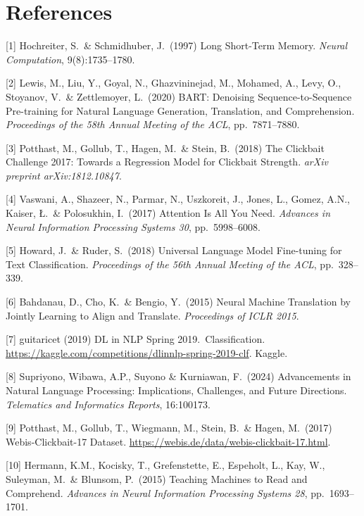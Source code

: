 \documentclass{article}
\begin{document}
\section*{References}
\medskip
{
\small

[1] Hochreiter, S.\ \& Schmidhuber, J.\ (1997) Long Short-Term Memory.
\textit{Neural Computation}, 9(8):1735--1780.

[2] Lewis, M., Liu, Y., Goyal, N., Ghazvininejad, M., Mohamed, A., Levy, O., Stoyanov, V.\ \& Zettlemoyer, L.\ (2020) BART: Denoising Sequence-to-Sequence Pre-training for Natural Language Generation, Translation, and Comprehension.
\textit{Proceedings of the 58th Annual Meeting of the ACL}, pp.~7871--7880.

[3] Potthast, M., Gollub, T., Hagen, M.\ \& Stein, B.\ (2018) The Clickbait Challenge 2017: Towards a Regression Model for Clickbait Strength.
\textit{arXiv preprint arXiv:1812.10847}.

[4] Vaswani, A., Shazeer, N., Parmar, N., Uszkoreit, J., Jones, L., Gomez, A.N., Kaiser, {\L}.\ \& Polosukhin, I.\ (2017) Attention Is All You Need.
\textit{Advances in Neural Information Processing Systems 30}, pp.~5998--6008.

[5] Howard, J.\ \& Ruder, S.\ (2018) Universal Language Model Fine-tuning for Text Classification.
\textit{Proceedings of the 56th Annual Meeting of the ACL}, pp.~328--339.

[6] Bahdanau, D., Cho, K.\ \& Bengio, Y.\ (2015) Neural Machine Translation by Jointly Learning to Align and Translate.
\textit{Proceedings of ICLR 2015}.

[7] guitaricet (2019) DL in NLP Spring 2019.\ Classification.
\url{https://kaggle.com/competitions/dlinnlp-spring-2019-clf}. Kaggle.

[8] Supriyono, Wibawa, A.P., Suyono \& Kurniawan, F.\ (2024) Advancements in Natural Language Processing: Implications, Challenges, and Future Directions.
\textit{Telematics and Informatics Reports}, 16:100173.

[9] Potthast, M., Gollub, T., Wiegmann, M., Stein, B.\ \& Hagen, M.\ (2017) Webis-Clickbait-17 Dataset.
\url{https://webis.de/data/webis-clickbait-17.html}.

[10] Hermann, K.M., Kocisky, T., Grefenstette, E., Espeholt, L., Kay, W., Suleyman, M.\ \& Blunsom, P.\ (2015) Teaching Machines to Read and Comprehend.
\textit{Advances in Neural Information Processing Systems 28}, pp.~1693--1701.

}
\end{document}
